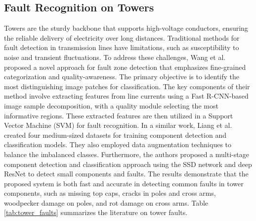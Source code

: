 \subsection{Fault Recognition on Towers}
Towers are the sturdy backbone that supports high-voltage conductors, ensuring the reliable delivery of electricity over long distances. Traditional methods for fault detection in transmission lines have limitations, such as susceptibility to noise and transient fluctuations. To address these challenges, Wang et al. \cite{wang_image_2019} proposed a novel approach for fault zone detection that emphasizes fine-grained categorization and quality-awareness. The primary objective is to identify the most distinguishing image patches for classification. The key components of their method involve extracting features from line currents using a Fast R-CNN-based image sample decomposition, with a quality module selecting the most informative regions. These extracted features are then utilized in a Support Vector Machine (SVM) \cite{cortes1995support} for fault recognition. In a similar work, Liang et al. \cite{liang_detection_2020} created four medium-sized datasets for training component detection and classification models. They also employed data augmentation techniques to balance the imbalanced classes. Furthermore, the authors proposed a multi-stage component detection and classification approach using the SSD network and deep ResNet to detect small components and faults. The results demonstrate that the proposed system is both fast and accurate in detecting common faults in tower components, such as missing top caps, cracks in poles and cross arms, woodpecker damage on poles, and rot damage on cross arms. Table \ref{tab:tower_faults} summarizes the literature on tower faults.


